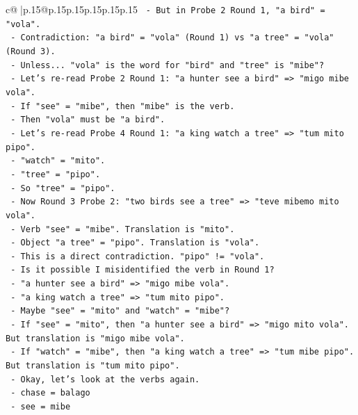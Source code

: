 \documentclass{article}
\begin{document}
{\begin{supertabular}{c@{$\;$}|p{.15\linewidth}@{}p{.15\linewidth}p{.15\linewidth}p{.15\linewidth}p{.15\linewidth}p{.15\linewidth}}
{{{\texttt{          {-} But in Probe 2 Round 1, "a bird" = "vola".} \\
\texttt{          {-} Contradiction: "a bird" = "vola" (Round 1) vs "a tree" = "vola" (Round 3).} \\
\texttt{          {-} Unless... "vola" is the word for "bird" and "tree" is "mibe"?} \\
\texttt{          {-} Let's re{-}read Probe 2 Round 1: "a hunter see a bird" => "migo mibe vola".} \\
\texttt{            {-} If "see" = "mibe", then "mibe" is the verb.} \\
\texttt{            {-} Then "vola" must be "a bird".} \\
\texttt{          {-} Let's re{-}read Probe 4 Round 1: "a king watch a tree" => "tum mito pipo".} \\
\texttt{            {-} "watch" = "mito".} \\
\texttt{            {-} "tree" = "pipo".} \\
\texttt{          {-} So "tree" = "pipo".} \\
\texttt{          {-} Now Round 3 Probe 2: "two birds see a tree" => "teve mibemo mito vola".} \\
\texttt{            {-} Verb "see" = "mibe". Translation is "mito".} \\
\texttt{            {-} Object "a tree" = "pipo". Translation is "vola".} \\
\texttt{            {-} This is a direct contradiction. "pipo" != "vola".} \\
\texttt{            {-} Is it possible I misidentified the verb in Round 1?} \\
\texttt{            {-} "a hunter see a bird" => "migo mibe vola".} \\
\texttt{            {-} "a king watch a tree" => "tum mito pipo".} \\
\texttt{            {-} Maybe "see" = "mito" and "watch" = "mibe"?} \\
\texttt{            {-} If "see" = "mito", then "a hunter see a bird" => "migo mito vola". But translation is "migo mibe vola".} \\
\texttt{            {-} If "watch" = "mibe", then "a king watch a tree" => "tum mibe pipo". But translation is "tum mito pipo".} \\
\texttt{            {-} Okay, let's look at the verbs again.} \\
\texttt{              {-} chase = balago} \\
\texttt{              {-} see = mibe} \\
}}}
\end{supertabular}}
\end{document}

